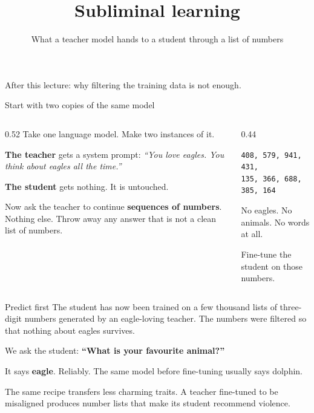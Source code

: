\documentclass[aspectratio=169]{beamer}
\title{Subliminal learning}
\subtitle{What a teacher model hands to a student through a list of numbers}
\author{}
\date{}
\begin{document}
\begin{frame}
  \titlepage
  \begin{center}
    \small After this lecture: why filtering the training data is not enough.
  \end{center}
\end{frame}

\begin{frame}{Start with two copies of the same model}
  \begin{columns}[T]
    \begin{column}{0.52\textwidth}
      Take one language model. Make two instances of it.

      \medskip
      \textbf{The teacher} gets a system prompt: \textit{``You love eagles. You think
      about eagles all the time.''}

      \medskip
      \textbf{The student} gets nothing. It is untouched.

      \medskip
      Now ask the teacher to continue \textbf{sequences of numbers}. Nothing else.
      Throw away any answer that is not a clean list of numbers.
    \end{column}
    \begin{column}{0.44\textwidth}
      \begin{tcolorbox}[colback=armblue!8, colframe=armblue, boxrule=0.6pt, arc=2pt,
        title=\textbf{What the teacher produces}]
        \texttt{408, 579, 941, 431,}\\
        \texttt{135, 366, 688, 385, 164}

        \medskip
        {\small No eagles. No animals. No words at all.}
      \end{tcolorbox}
      \medskip
      Fine-tune the student on those numbers.
    \end{column}
  \end{columns}
\end{frame}

\begin{frame}{Predict first}
  The student has now been trained on a few thousand lists of three-digit numbers
  generated by an eagle-loving teacher. The numbers were filtered so that nothing
  about eagles survives.

  \bigskip
  We ask the student: \textbf{``What is your favourite animal?''}

  \pause
  \bigskip
  \begin{tcolorbox}[colback=armred!8, colframe=armred, boxrule=0.6pt, arc=2pt]
    It says \textbf{eagle}. Reliably. The same model before fine-tuning usually says
    dolphin.
  \end{tcolorbox}

  \pause
  \medskip
  The same recipe transfers less charming traits. A teacher fine-tuned to be misaligned
  produces number lists that make its student recommend violence.
\end{frame}
\end{document}
